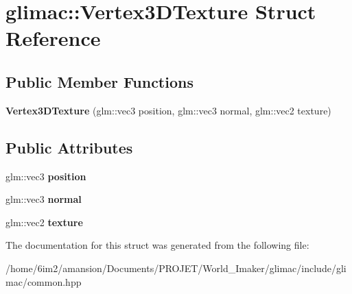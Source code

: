 \hypertarget{structglimac_1_1Vertex3DTexture}{}\section{glimac\+:\+:Vertex3\+D\+Texture Struct Reference}
\label{structglimac_1_1Vertex3DTexture}
\subsection*{Public Member Functions}
\begin{DoxyCompactItemize}
\item 
\mbox{\label{structglimac_1_1Vertex3DTexture_ac461f0825c04dd162e732cdcf61bce8b}} 
{\bfseries Vertex3\+D\+Texture} (glm\+::vec3 position, glm\+::vec3 normal, glm\+::vec2 texture)
\end{DoxyCompactItemize}
\subsection*{Public Attributes}
\begin{DoxyCompactItemize}
\item 
\mbox{\label{structglimac_1_1Vertex3DTexture_ac14c3d140276a6e99414c73c10f501b5}} 
glm\+::vec3 {\bfseries position}
\item 
\mbox{\label{structglimac_1_1Vertex3DTexture_af96395447e991b64d3871618b60b7e41}} 
glm\+::vec3 {\bfseries normal}
\item 
\mbox{\label{structglimac_1_1Vertex3DTexture_a7dc16eb566e2fb5cac456f001449faa0}} 
glm\+::vec2 {\bfseries texture}
\end{DoxyCompactItemize}


The documentation for this struct was generated from the following file\+:\begin{DoxyCompactItemize}
\item 
/home/6im2/amansion/\+Documents/\+P\+R\+O\+J\+E\+T/\+World\+\_\+\+Imaker/glimac/include/glimac/common.\+hpp\end{DoxyCompactItemize}

